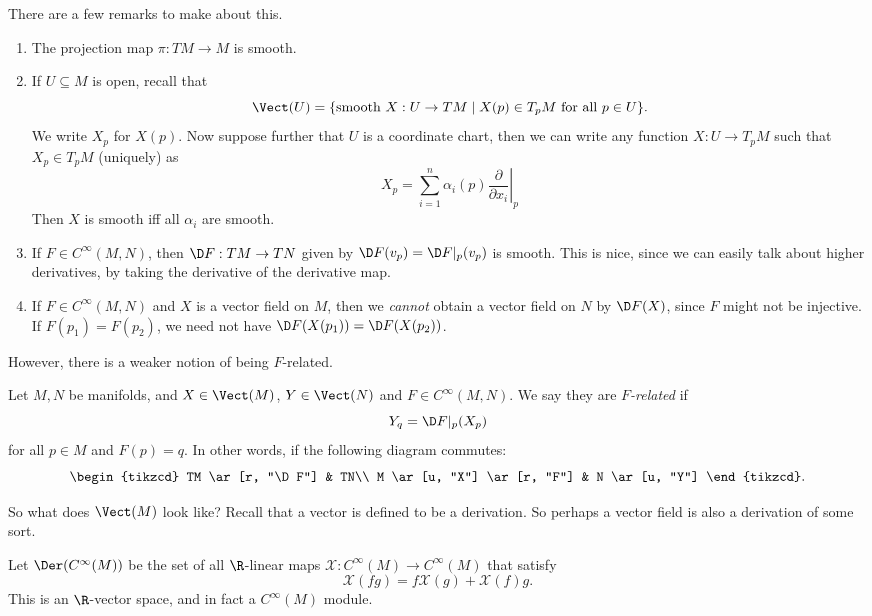 \documentclass[a4paper]{article}
\begin{document}
There are a few remarks to make about this.
\begin{enumerate}
  \item The projection map $\pi: TM \to M$ is smooth.
  \item If $U \subseteq M$ is open, recall that
    \[
      \Vect(U) = \{\text{smooth }X: U \to TM\mid X(p) \in T_pM\text{ for all }p \in U\}.
    \]
    We write $X_p$ for $X(p)$. Now suppose further that $U$ is a coordinate chart, then we can write any function $X: U \to T_p M$ such that $X_p \in T_p M$ (uniquely) as
    \[
      X_p = \sum_{i = 1}^n \alpha_i(p) \left.\frac{\partial}{\partial x_i} \right|_p
    \]
    Then $X$ is smooth iff all $\alpha_i$ are smooth.
  \item If $F \in C^\infty(M, N)$, then $\D F: TM \to TN$ given by $\D F(v_p) = \D F|_p(v_p)$ is smooth. This is nice, since we can easily talk about higher derivatives, by taking the derivative of the derivative map.
  \item If $F \in C^\infty (M, N)$ and $X$ is a vector field on $M$, then we \emph{cannot} obtain a vector field on $N$ by $\D F(X)$, since $F$ might not be injective. If $F(p_1) = F(p_2)$, we need not have $\D F(X(p_1)) = \D F(X(p_2))$.
\end{enumerate}
However, there is a weaker notion of being $F$-related.
\begin{defi}[$F$-related]
  Let $M, N$ be manifolds, and $X \in \Vect(M)$, $Y \in \Vect(N)$ and $F \in C^\infty(M, N)$. We say they are \emph{$F$-related} if
  \[
    Y_q = \D F|_p (X_p)
  \]
  for all $p \in M$ and $F(p) = q$. In other words, if the following diagram commutes:
  \[
    \begin{tikzcd}
      TM \ar[r, "\D F"] & TN\\
      M \ar[u, "X"] \ar[r, "F"] & N \ar[u, "Y"]
    \end{tikzcd}.
  \]
\end{defi}

So what does $\Vect(M)$ look like? Recall that a vector is defined to be a derivation. So perhaps a vector field is also a derivation of some sort.
\begin{defi}
  Let $\Der(C^\infty(M))$ be the set of all $\R$-linear maps $\mathcal{X}: C^\infty(M) \to C^\infty(M)$ that satisfy
  \[
    \mathcal{X}(fg) = f \mathcal{X}(g) + \mathcal{X}(f) g.
  \]
  This is an $\R$-vector space, and in fact a $C^\infty(M)$ module.
\end{defi}
\end{document}
